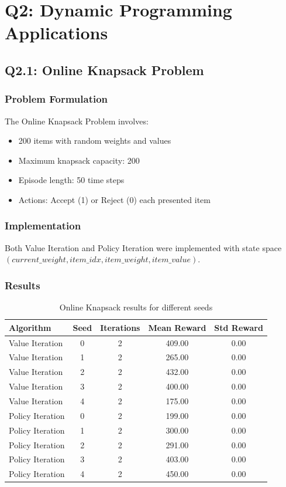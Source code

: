 \documentclass[12pt]{article}
\begin{document}
\clearpage
\section{Q2: Dynamic Programming Applications}

\subsection{Q2.1: Online Knapsack Problem}

\subsubsection{Problem Formulation}

The Online Knapsack Problem involves:
\begin{itemize}
    \item 200 items with random weights and values
    \item Maximum knapsack capacity: 200
    \item Episode length: 50 time steps
    \item Actions: Accept (1) or Reject (0) each presented item
\end{itemize}

\subsubsection{Implementation}

Both Value Iteration and Policy Iteration were implemented with state space $(current\_weight, item\_idx, item\_weight, item\_value)$.

\subsubsection{Results}

\begin{table}[H]
\centering
\caption{Online Knapsack results for different seeds}
\begin{tabular}{lcccc}
\toprule
Algorithm & Seed & Iterations & Mean Reward & Std Reward \\
\midrule
Value Iteration & 0 & 2 & 409.00 & 0.00 \\
Value Iteration & 1 & 2 & 265.00 & 0.00 \\
Value Iteration & 2 & 2 & 432.00 & 0.00 \\
Value Iteration & 3 & 2 & 400.00 & 0.00 \\
Value Iteration & 4 & 2 & 175.00 & 0.00 \\
Policy Iteration & 0 & 2 & 199.00 & 0.00 \\
Policy Iteration & 1 & 2 & 300.00 & 0.00 \\
Policy Iteration & 2 & 2 & 291.00 & 0.00 \\
Policy Iteration & 3 & 2 & 403.00 & 0.00 \\
Policy Iteration & 4 & 2 & 450.00 & 0.00 \\
\bottomrule
\end{tabular}
\end{table}
\end{document}
